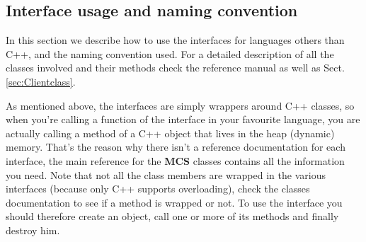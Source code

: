 \documentclass[12pt,titlepage]{article}
\newcommand{\mcs}{\textbf{MCS} }
\begin{document}
%
%
%
%
%
%
%							
%							
%
%
%
%

%
\subsection{Interface usage and naming convention}
In this section we describe how to use the interfaces for languages
others than C++, and the naming convention used. For a detailed
description of all the classes involved and their methods check the
reference manual as well as Sect. \ref{sec:Clientclass}.

\bigskip
As mentioned above, the interfaces are simply wrappers around C++
classes, so when you're calling a function of the interface in your
favourite language, you are actually calling a method of a C++ object
that lives in the heap (dynamic) memory. That's the reason why there
isn't a reference documentation for each interface, the main reference
for the \mcs classes contains all the information you need. Note
that not all the class members are wrapped in the various interfaces
(because only C++ supports overloading), check the classes
documentation to see if a method is wrapped or not. To use the
interface you should therefore create an object, call one or more of
its methods and finally destroy him.
\end{document}
